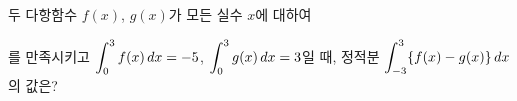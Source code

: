 두 다항함수 $f(x)$, $g(x)$가 모든 실수 $x$에 대하여\par\smallskip{}\par\smallskip\noindent 를 만족시키고 $\displaystyle\int_{0}^{3}f(x)\mkern3mu dx=-5$, $\displaystyle\int_{0}^{3}g(x)\mkern3mu dx=3$일 때, 정적분 $\displaystyle\int_{-3}^{3}\{f(x)-g(x)\}\mkern3mu dx$의 값은?
